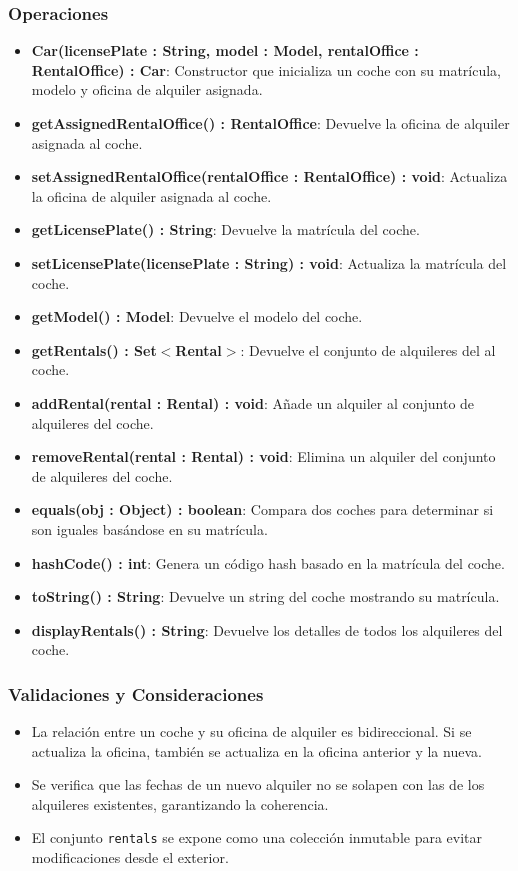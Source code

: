 \subsubsection*{Operaciones}

\begin{itemize}
    \item \textbf{Car(licensePlate : String, model : Model, rentalOffice : RentalOffice) : Car}: 
    Constructor que inicializa un coche con su matrícula, modelo y oficina de alquiler asignada.
    \item \textbf{getAssignedRentalOffice() : RentalOffice}: Devuelve la oficina de alquiler asignada al coche.
    \item \textbf{setAssignedRentalOffice(rentalOffice : RentalOffice) : void}: Actualiza la oficina de alquiler asignada al coche.
    \item \textbf{getLicensePlate() : String}: Devuelve la matrícula del coche.
    \item \textbf{setLicensePlate(licensePlate : String) : void}: Actualiza la matrícula del coche.
    \item \textbf{getModel() : Model}: Devuelve el modelo del coche.
    \item \textbf{getRentals() : Set$<$Rental$>$}: Devuelve el conjunto de alquileres del al coche.
    \item \textbf{addRental(rental : Rental) : void}: Añade un alquiler al conjunto de alquileres del coche. 
    \item \textbf{removeRental(rental : Rental) : void}: Elimina un alquiler del conjunto de alquileres del coche.
    \item \textbf{equals(obj : Object) : boolean}: Compara dos coches para determinar si son iguales basándose en su matrícula.
    \item \textbf{hashCode() : int}: Genera un código hash basado en la matrícula del coche.
    \item \textbf{toString() : String}: Devuelve un string  del coche mostrando su matrícula.
    \item \textbf{displayRentals() : String}: Devuelve los detalles de todos los alquileres del coche.
\end{itemize}

\subsubsection*{Validaciones y Consideraciones}

\begin{itemize}
    \item La relación entre un coche y su oficina de alquiler es bidireccional. Si se actualiza la oficina, también se actualiza en la oficina anterior y la nueva.
    \item Se verifica que las fechas de un nuevo alquiler no se solapen con las de los alquileres existentes, garantizando la coherencia.
    \item El conjunto \texttt{rentals} se expone como una colección inmutable para evitar modificaciones desde el exterior.
\end{itemize}


